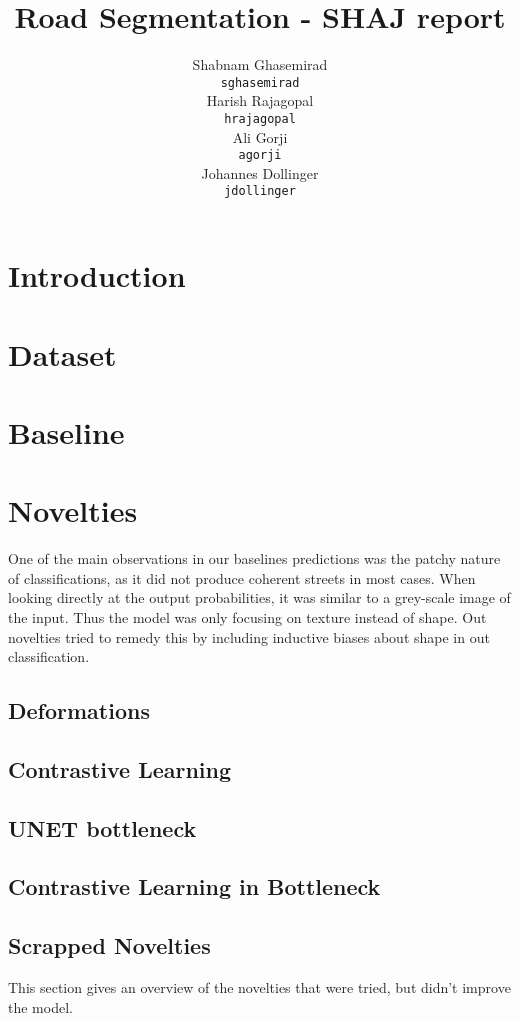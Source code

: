 \documentclass{article}
\title{Road Segmentation - SHAJ report}
\author{
  Shabnam Ghasemirad\\
  \texttt{sghasemirad} \\
   \And
  Harish Rajagopal \\
  \texttt{hrajagopal} \\
   \And
  Ali Gorji \\
  \texttt{agorji} \\
   \And
  Johannes Dollinger \\
  \texttt{jdollinger} \\
}
\begin{document}
\maketitle

\section{Introduction} \label{intro}


\section{Dataset}\label{section:literature_review}


\section{Baseline}\label{section:baselines}


\section{Novelties}
One of the main observations in our baselines predictions was the patchy nature of classifications, as it did not produce coherent streets in most cases. When looking directly at the output probabilities, it was similar to a grey-scale image of the input. Thus the model was only focusing on texture instead of shape. Out novelties tried to remedy this by including inductive biases about shape in out classification.
   
   \subsection{Deformations}
    \subsection{Contrastive Learning}

    \subsection{UNET bottleneck}

    \subsection{Contrastive Learning in Bottleneck}
   
    \subsection{Scrapped Novelties}
    This section gives an overview of the novelties that were tried, but didn't improve the model.
    
\end{document}
